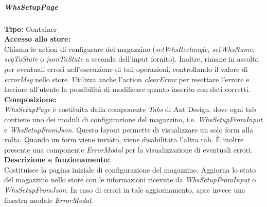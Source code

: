 \subparagraph{\colorbox{verde_uml}{WhsSetupPage}}
\textbf{Tipo:} Container \\
\textbf{Accesso allo store:} \\
Chiama le action di configurare del magazzino (\textit{setWhsRectangle}, \textit{setWhsName}, \textit{svgToState} o \textit{jsonToState} a seconda dell'input fornito). Inoltre, rimane in ascolto per eventuali errori nell'esecuzione di tali operazioni, controllando il valore di \textit{errorMsg} nello store. Utilizza anche l'action \textit{clearError} per resettare l'errore e lasciare all'utente la possibilità di modificare quanto inserito con dati corretti.\\
\textbf{Composizione:} \\
\textit{WhsSetupPage} è costituita dalla componente \textit{Tabs} di Ant Design, dove ogni tab contiene uno dei moduli di configurazione del magazzino, i.e. \textit{WhsSetupFromInput} e \textit{WhsSetupFromJson}. Questo layout permette di visualizzare un solo form alla volta. Quando un form viene inviato, viene disabilitata l'altra tab. È inoltre presente una componente \textit{ErrorModal} per la visualizzazione di eventuali errori.\\
\textbf{Descrizione e funzionamento:} \\
Costituisce la pagina iniziale di configurazione del magazzino. Aggiorna lo stato del magazzino nello store con le informazioni ricevute da \textit{WhsSetupFromInput} o \textit{WhsSetupFromJson}. In caso di errori in tale aggiornamento, apre invece una finestra modale \textit{ErrorModal}.

